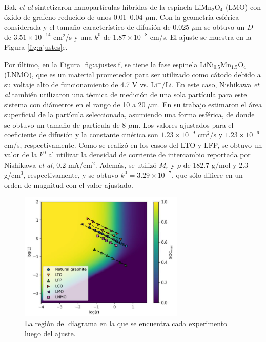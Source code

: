Bak \textit{et al} \cite{bak2011} sintetizaron nanopartículas híbridas de la 
espinela LiMn$_2$O$_4$ (LMO) con óxido de grafeno reducido de unos 0.01--0.04 
$\mu$m. Con la geometría esférica considerada y el tamaño característico de 
difusión de 0.025 $\mu$m se obtuvo un $D$ de $3.51\times10^{-14}$ cm$^2$/s y una
$k^0$ de $1.87\times10^{-8}$ cm/s. El ajuste se muestra en la Figura 
\ref{fig:ajustes}e.

Por último, en la Figura \ref{fig:ajustes}f, se tiene la fase espinela 
LiNi$_{0.5}$Mn$_{1.5}$O$_4$ (LNMO), que es un material prometedor para ser 
utilizado como cátodo debido a su voltaje alto de funcionamiento de 4.7 V vs. 
Li$^+$/Li. En este caso, Nishikawa \textit{et al} \cite{nishikawa2017} también
utilizaron una técnica de medición de una sola partícula para este sistema con 
diámetros en el rango de 10 a 20 $\mu$m. En su trabajo estimaron el área 
superficial de la partícula seleccionada, asumiendo una forma esférica, de donde
se obtuvo un tamaño de partícula de 8 $\mu$m. Los valores ajustados para el
coeficiente de difusión y la constante cinética son $1.23\times10^{-9}$ cm$^2$/s 
y $1.23\times10^{-6}$ cm/s, respectivamente. Como se realizó en los casos del 
LTO y LFP, se obtuvo un valor de la $k^0$ al utilizar la densidad de corriente
de intercambio reportada por Nishikawa \textit{et al}, 0.2 mA/cm$^2$. Además,
se utilizó $M_r$ y $\rho$ de 182.7 g/mol y 2.3 g/cm$^3$, respectivamente, y se
obtuvo $k^0 = 3.29\times10^{-7}$, que sólo difiere en un orden de magnitud con 
el valor ajustado.

\begin{figure}[h!]
    \centering
    \includegraphics[width=0.7\textwidth]{FastCharging/un/resultados/ajuste/mapa.png}
    \caption{La región del diagrama en la que se encuentra cada experimento 
    \cite{mancini2022, he2012, lei2015, wang2019high, bak2011, nishikawa2017}
    luego del ajuste.}
    \label{fig:ajustes-mapa}
\end{figure}

